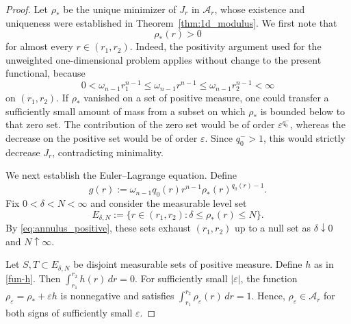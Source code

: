 \documentclass[12pt]{amsart}
\numberwithin{equation}{section}
\theoremstyle{plain}
\theoremstyle{definition}
\begin{document}
\begin{proof}
Let $\rho_*$ be the unique minimizer of $J_r$ in $\mathcal A_r$, whose
existence and uniqueness were established in
Theorem~\ref{thm:1d_modulus}. We first note that
\begin{equation}
\label{eq:annulus_positive}
\rho_*(r)>0
\end{equation}
for almost every $r\in(r_1,r_2)$.
Indeed, the positivity argument used for the unweighted one-dimensional
problem applies without change to the present functional, because
\begin{equation*}
0<\omega_{n-1}r_1^{n-1}
\le
\omega_{n-1}r^{n-1}
\le
\omega_{n-1}r_2^{n-1}
<\infty
\end{equation*}
on $(r_1,r_2)$. If $\rho_*$ vanished on a set of positive measure, one
could transfer a sufficiently small amount of mass from a subset on
which $\rho_*$ is bounded below to that zero set. The contribution of
the zero set would be of order $\varepsilon^{q_0^-}$, whereas the
decrease on the positive set would be of order $\varepsilon$. Since
$q_0^->1$, this would strictly decrease $J_r$, contradicting minimality.

We next establish the Euler--Lagrange equation. Define
\begin{equation*}
g(r)
:=
\omega_{n-1}q_0(r)r^{n-1}
\rho_*(r)^{q_0(r)-1}.
\end{equation*}
Fix $0<\delta<N<\infty$ and consider the measurable level set
\begin{equation*}
E_{\delta,N}
:=
\{r\in(r_1,r_2):\delta\le\rho_*(r)\le N\}.
\end{equation*}
By \eqref{eq:annulus_positive}, these sets exhaust $(r_1,r_2)$ up to a
null set as $\delta\downarrow0$ and $N\uparrow\infty$.

Let $S,T\subset E_{\delta,N}$ be disjoint measurable sets of positive
measure. Define $h$ as in \eqref{fun-h}.
Then $\int_{r_1}^{r_2}h(r)\,dr=0.$
For sufficiently small $|\varepsilon|$, the function
$\rho_\varepsilon=\rho_*+\varepsilon h$
is nonnegative and satisfies
$\int_{r_1}^{r_2}\rho_\varepsilon(r)\,dr=1.$
Hence, $\rho_\varepsilon\in\mathcal A_r$ for both signs of sufficiently
small $\varepsilon$.


\end{proof}
\end{document}
